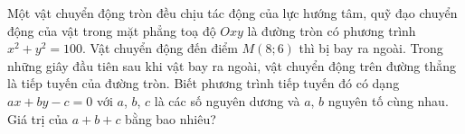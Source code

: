 

\begin{bt}%
	Một vật chuyển động tròn đều chịu tác động của lực hướng tâm, quỹ đạo chuyển động của vật trong mặt phẳng toạ độ $Oxy$ là đường tròn có phương trình $x^2+y^2=100$. Vật chuyển động đến điểm $M(8;6)$  thì bị bay ra ngoài. Trong những giây đầu tiên sau khi vật bay ra ngoài, vật chuyển động trên đường thẳng là tiếp tuyến của đường tròn. Biết phương trình tiếp tuyến đó có dạng $ ax + b y - c = 0$ với $a$, $b$, $c$ là các số nguyên dương và $a$, $b$ nguyên tố cùng nhau. Giá trị của $a + b + c $ bằng bao nhiêu?
\end{bt}

